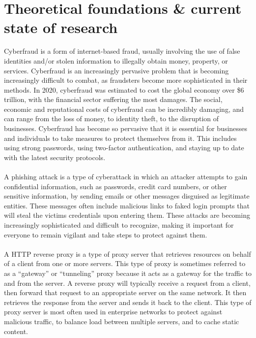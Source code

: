 \documentclass [14pt]{extarticle}
\begin{document}
\section{Theoretical foundations \& current state of research}
Cyberfraud is a form of internet-based fraud, usually involving the use of false identities and/or stolen information to illegally obtain money, property, or services. Cyberfraud is an increasingly pervasive problem that is becoming increasingly difficult to combat, as fraudsters become more sophisticated in their methods.
In 2020, cyberfraud was estimated to cost the global economy over \$6 trillion\cite{6trillion}, with the financial sector suffering the most damages. The social, economic and reputational costs of cyberfraud can be incredibly damaging, and can range from the loss of money, to identity theft, to the disruption of businesses. Cyberfraud has become so pervasive that it is essential for businesses and individuals to take measures to protect themselves from it. This includes using strong passwords, using two-factor authentication, and staying up to date with the latest security protocols. \\ \\
A phishing attack is a type of cyberattack in which an attacker attempts to gain confidential information, such as passwords, credit card numbers, or other sensitive information, by sending emails or other messages disguised as legitimate entities. These messages often include malicious links to faked login prompts that will steal the victims credentials upon entering them. These attacks are becoming increasingly sophisticated and difficult to recognize, making it important for everyone to remain vigilant and take steps to protect against them. \\ \\
A HTTP reverse proxy is a type of proxy server that retrieves resources on behalf of a client from one or more servers. This type of proxy is sometimes referred to as a “gateway” or “tunneling” proxy because it acts as a gateway for the traffic to and from the server. A reverse proxy will typically receive a request from a client, then forward that request to an appropriate server on the same network. It then retrieves the response from the server and sends it back to the client. This type of proxy server is most often used in enterprise networks to protect against malicious traffic, to balance load between multiple servers, and to cache static content. \\ \\
\end{document}

